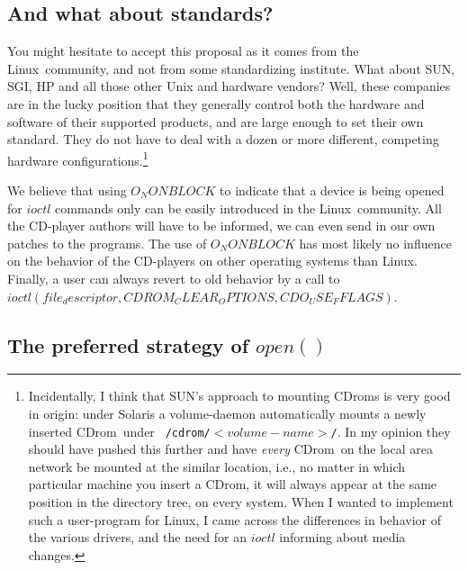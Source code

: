 \documentclass{article}
\def\linux{{\sc Linux}}
\def\cdrom{{\sc CDrom}}
\begin{document}
\subsection{And what about standards?}

You might hesitate to accept this proposal as it comes from the
\linux\ community, and not from some standardizing institute. What
about SUN, SGI, HP and all those other Unix and hardware vendors?
Well, these companies are in the lucky position that they generally
control both the hardware and software of their supported products,
and are large enough to set their own standard. They do not have to
deal with a dozen or more different, competing hardware
configurations.\footnote{Incidentally, I think that SUN's approach to
mounting \cdrom s is very good in origin: under Solaris a
volume-daemon automatically mounts a newly inserted \cdrom\ under {\tt
/cdrom/$<volume-name>$/}. In my opinion they should have pushed this
further and have {\em every\/} \cdrom\ on the local area network be
mounted at the similar location, i.e., no matter in which particular
machine you insert a \cdrom, it will always appear at the same
position in the directory tree, on every system. When I wanted to
implement such a user-program for \linux, I came across the
differences in behavior of the various drivers, and the need for an
$ioctl$ informing about media changes.}

We believe that using $O_NONBLOCK$ to indicate that a device is being opened
for $ioctl$ commands only can be easily introduced in the \linux\
community. All the CD-player authors will have to be informed, we can
even send in our own patches to the programs. The use of $O_NONBLOCK$
has most likely no influence on the behavior of the CD-players on
other operating systems than \linux. Finally, a user can always revert
to old behavior by a call to $ioctl(file_descriptor, CDROM_CLEAR_OPTIONS,
CDO_USE_FFLAGS)$. 

\subsection{The preferred strategy of $open()$}
\end{document}
